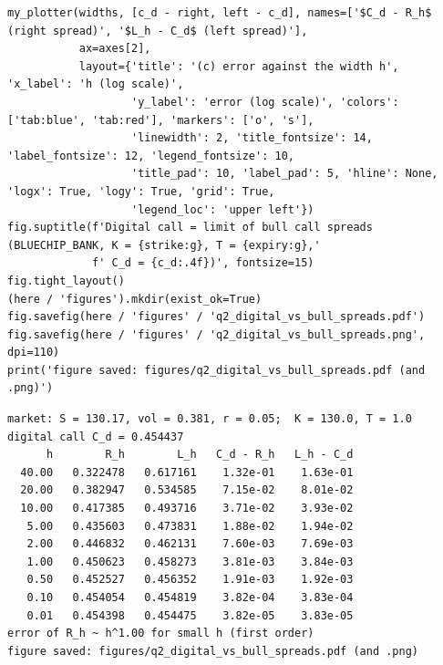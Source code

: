 \documentclass[11pt,a4paper]{article}
\begin{document}
\begin{lstlisting}[style=pysmall]
my_plotter(widths, [c_d - right, left - c_d], names=['$C_d - R_h$ (right spread)', '$L_h - C_d$ (left spread)'],
           ax=axes[2],
           layout={'title': '(c) error against the width h', 'x_label': 'h (log scale)',
                   'y_label': 'error (log scale)', 'colors': ['tab:blue', 'tab:red'], 'markers': ['o', 's'],
                   'linewidth': 2, 'title_fontsize': 14, 'label_fontsize': 12, 'legend_fontsize': 10,
                   'title_pad': 10, 'label_pad': 5, 'hline': None, 'logx': True, 'logy': True, 'grid': True,
                   'legend_loc': 'upper left'})
fig.suptitle(f'Digital call = limit of bull call spreads  (BLUECHIP_BANK, K = {strike:g}, T = {expiry:g},'
             f' C_d = {c_d:.4f})', fontsize=15)
fig.tight_layout()
(here / 'figures').mkdir(exist_ok=True)
fig.savefig(here / 'figures' / 'q2_digital_vs_bull_spreads.pdf')
fig.savefig(here / 'figures' / 'q2_digital_vs_bull_spreads.png', dpi=110)
print('figure saved: figures/q2_digital_vs_bull_spreads.pdf (and .png)')
\end{lstlisting}
\begin{lstlisting}[style=out]
market: S = 130.17, vol = 0.381, r = 0.05;  K = 130.0, T = 1.0
digital call C_d = 0.454437
      h        R_h        L_h   C_d - R_h   L_h - C_d
  40.00   0.322478   0.617161    1.32e-01    1.63e-01
  20.00   0.382947   0.534585    7.15e-02    8.01e-02
  10.00   0.417385   0.493716    3.71e-02    3.93e-02
   5.00   0.435603   0.473831    1.88e-02    1.94e-02
   2.00   0.446832   0.462131    7.60e-03    7.69e-03
   1.00   0.450623   0.458273    3.81e-03    3.84e-03
   0.50   0.452527   0.456352    1.91e-03    1.92e-03
   0.10   0.454054   0.454819    3.82e-04    3.83e-04
   0.01   0.454398   0.454475    3.82e-05    3.83e-05
error of R_h ~ h^1.00 for small h (first order)
figure saved: figures/q2_digital_vs_bull_spreads.pdf (and .png)
\end{lstlisting}
\end{document}
